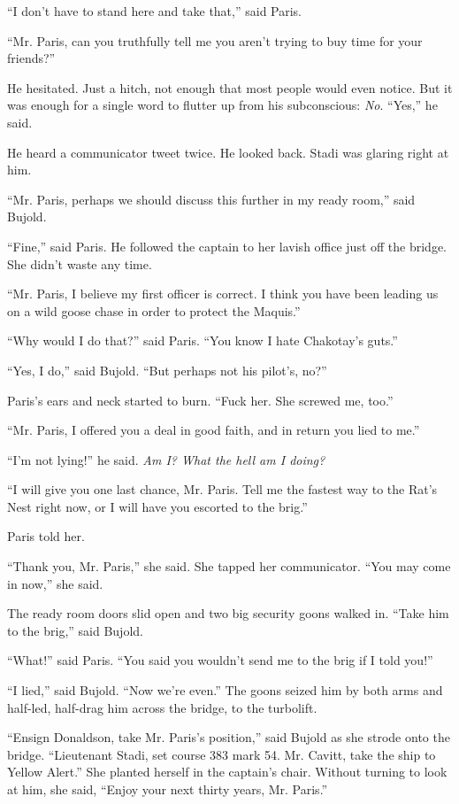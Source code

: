 \documentclass[twoside,letterpaper,12pt]{memoir}
\begin{document}
``I don't have to stand here and take that,'' said Paris.

``Mr. Paris, can you truthfully tell me you aren't trying to buy time for your friends?''

He hesitated. Just a hitch, not enough that most people would even notice. But it was enough for a single word to flutter up from his subconscious: \textit{No}. ``Yes,'' he said.

He heard a communicator tweet twice. He looked back. Stadi was glaring right at him.

``Mr. Paris, perhaps we should discuss this further in my ready room,'' said Bujold.

``Fine,'' said Paris. He followed the captain to her lavish office just off the bridge. She didn't waste any time.

``Mr. Paris, I believe my first officer is correct. I think you have been leading us on a wild goose chase in order to protect the Maquis.''

``Why would I do that?'' said Paris. ``You know I hate Chakotay's guts.''

``Yes, I do,'' said Bujold. ``But perhaps not his pilot's, no?''

Paris's ears and neck started to burn. ``Fuck her. She screwed me, too.''

``Mr. Paris, I offered you a deal in good faith, and in return you lied to me.''

``I'm not lying!'' he said. \textit{Am I? What the hell am I doing?}

``I will give you one last chance, Mr. Paris. Tell me the fastest way to the Rat's Nest right now, or I will have you escorted to the brig.''

Paris told her.

``Thank you, Mr. Paris,'' she said. She tapped her communicator. ``You may come in now,'' she said.

The ready room doors slid open and two big security goons walked in. ``Take him to the brig,'' said Bujold.

``What!'' said Paris. ``You said you wouldn't send me to the brig if I told you!''

``I lied,'' said Bujold. ``Now we're even.'' The goons seized him by both arms and half-led, half-drag him across the bridge, to the turbolift.

``Ensign Donaldson, take Mr. Paris's position,'' said Bujold as she strode onto the bridge. ``Lieutenant Stadi, set course 383 mark 54. Mr. Cavitt, take the ship to Yellow Alert.'' She planted herself in the captain's chair. Without turning to look at him, she said, ``Enjoy your next thirty years, Mr. Paris.''
\end{document}
